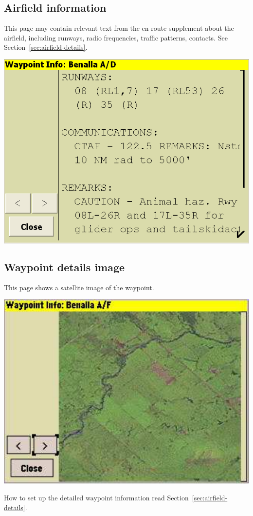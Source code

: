 \subsection*{Airfield information}
This page may contain relevant text from the en-route supplement about
the airfield, including runways, radio frequencies, traffic patterns,
contacts.
See Section~\ref{sec:airfield-details}.
\begin{center}
\includegraphics[angle=0,width=0.8\linewidth,keepaspectratio='true']{figures/dialog-waypointdetails1.png}
\end{center}

\subsection*{Waypoint details image}
This page shows a satellite image of the waypoint.

\begin{center}
\includegraphics[angle=0,width=0.8\linewidth,keepaspectratio='true']{figures/dialog-waypointdetails2.pdf}
\end{center}
How to set up the detailed waypoint information read Section~\ref{sec:airfield-details}.

